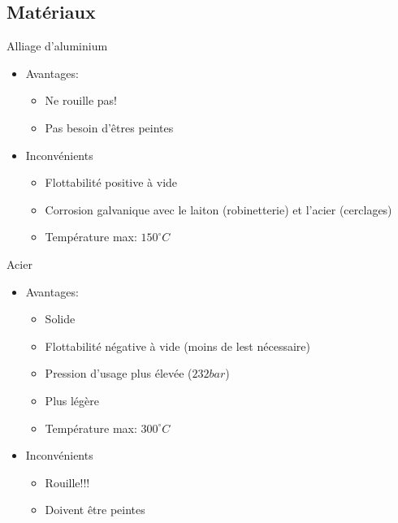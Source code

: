 \documentclass[aspectratio=1610,english,12pt]{beamer}
\begin{document}
\subsection{Matériaux}

\begin{frame}{Alliage d'aluminium}
	\begin{itemize}
		\item Avantages:
			\begin{itemize}
				\item Ne rouille pas!
				\item Pas besoin d'êtres peintes
			\end{itemize}
		\item Inconvénients
			\begin{itemize}
				\item Flottabilité positive à vide
				\item Corrosion galvanique avec le laiton (robinetterie) et l'acier (cerclages)
				\item Température max: $150^\circ C$
			\end{itemize}
	\end{itemize}
\end{frame}

\begin{frame}{Acier}
	\begin{itemize}
		\item Avantages:
			\begin{itemize}
				\item Solide
				\item Flottabilité négative à vide (moins de lest nécessaire)
				\item Pression d'usage plus élevée ($232bar$)
				\item Plus légère
				\item Température max: $300^\circ C$
			\end{itemize}
		\item Inconvénients
			\begin{itemize}
				\item Rouille!!!
				\item Doivent être peintes
			\end{itemize}
	\end{itemize}
\end{frame}
\end{document}
